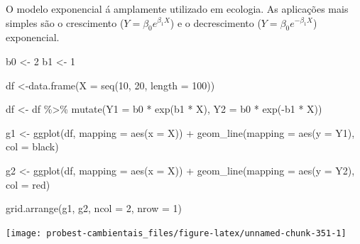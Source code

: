 \documentclass[
]{book}
\newenvironment{Shaded}{\begin{snugshade}}{\end{snugshade}}
\newcommand{\AttributeTok}[1]{\textcolor[rgb]{0.77,0.63,0.00}{#1}}
\newcommand{\DecValTok}[1]{\textcolor[rgb]{0.00,0.00,0.81}{#1}}
\newcommand{\FunctionTok}[1]{\textcolor[rgb]{0.00,0.00,0.00}{#1}}
\newcommand{\NormalTok}[1]{#1}
\newcommand{\OtherTok}[1]{\textcolor[rgb]{0.56,0.35,0.01}{#1}}
\newcommand{\SpecialCharTok}[1]{\textcolor[rgb]{0.00,0.00,0.00}{#1}}
\newcommand{\StringTok}[1]{\textcolor[rgb]{0.31,0.60,0.02}{#1}}
\begin{document}
O modelo exponencial á amplamente utilizado em ecologia. As aplicações mais simples são o crescimento (\(Y = \beta_0 e^{\beta_1 X}\)) e o decrescimento (\(Y = \beta_0 e^{-\beta_1 X}\)) exponencial.

\begin{Shaded}
\begin{Highlighting}[]
\NormalTok{b0 }\OtherTok{\textless{}{-}} \DecValTok{2}
\NormalTok{b1 }\OtherTok{\textless{}{-}} \DecValTok{1}

\NormalTok{df }\OtherTok{\textless{}{-}}\FunctionTok{data.frame}\NormalTok{(}\AttributeTok{X =} \FunctionTok{seq}\NormalTok{(}\DecValTok{10}\NormalTok{, }\DecValTok{20}\NormalTok{, }\AttributeTok{length =} \DecValTok{100}\NormalTok{))}

\NormalTok{df }\OtherTok{\textless{}{-}}\NormalTok{ df }\SpecialCharTok{\%\textgreater{}\%} \FunctionTok{mutate}\NormalTok{(}\AttributeTok{Y1 =}\NormalTok{ b0 }\SpecialCharTok{*} \FunctionTok{exp}\NormalTok{(b1 }\SpecialCharTok{*}\NormalTok{ X),}
                    \AttributeTok{Y2 =}\NormalTok{ b0 }\SpecialCharTok{*} \FunctionTok{exp}\NormalTok{(}\SpecialCharTok{{-}}\NormalTok{b1 }\SpecialCharTok{*}\NormalTok{ X))}

\NormalTok{g1 }\OtherTok{\textless{}{-}} \FunctionTok{ggplot}\NormalTok{(df, }\AttributeTok{mapping =} \FunctionTok{aes}\NormalTok{(}\AttributeTok{x =}\NormalTok{ X)) }\SpecialCharTok{+}
  \FunctionTok{geom\_line}\NormalTok{(}\AttributeTok{mapping =} \FunctionTok{aes}\NormalTok{(}\AttributeTok{y =}\NormalTok{ Y1), }\AttributeTok{col =} \StringTok{\textquotesingle{}black\textquotesingle{}}\NormalTok{)}

\NormalTok{g2 }\OtherTok{\textless{}{-}} \FunctionTok{ggplot}\NormalTok{(df, }\AttributeTok{mapping =} \FunctionTok{aes}\NormalTok{(}\AttributeTok{x =}\NormalTok{ X)) }\SpecialCharTok{+}
  \FunctionTok{geom\_line}\NormalTok{(}\AttributeTok{mapping =} \FunctionTok{aes}\NormalTok{(}\AttributeTok{y =}\NormalTok{ Y2), }\AttributeTok{col =} \StringTok{\textquotesingle{}red\textquotesingle{}}\NormalTok{)}

\FunctionTok{grid.arrange}\NormalTok{(g1, g2, }\AttributeTok{ncol =} \DecValTok{2}\NormalTok{, }\AttributeTok{nrow =} \DecValTok{1}\NormalTok{)}
\end{Highlighting}
\end{Shaded}

\begin{center}\texttt{[image: probest-cambientais\_files/figure-latex/unnamed-chunk-351-1]} \end{center}
\end{document}
